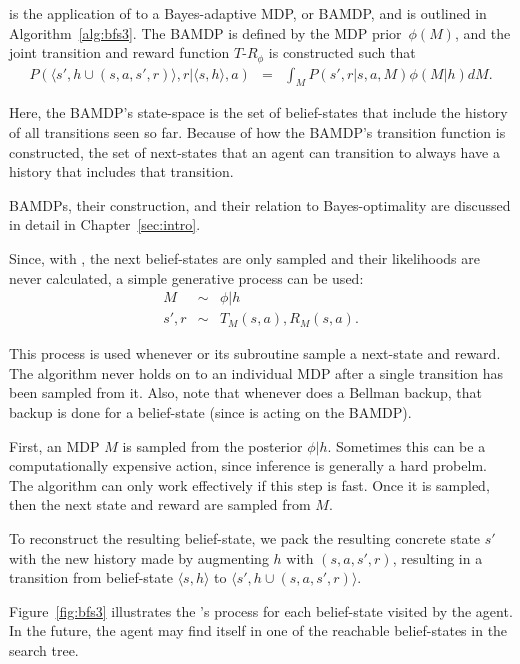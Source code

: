  is the application of  to a Bayes-adaptive MDP, or BAMDP, and is outlined in Algorithm~\ref{alg:bfs3}. The BAMDP is defined by the MDP prior~$\phi(M)$, and the joint transition and reward function ${T\mbox{-}R}_\phi$ is constructed such that
\begin{eqnarray*}
P(\langle s', h\cup (s,a,s',r)\rangle, r | \langle s, h\rangle, a) &=& \int_M P(s', r | s, a, M)\phi(M|h) dM.
\end{eqnarray*}

Here, the BAMDP's state-space is the set of belief-states that include the history of all transitions seen so far. Because of how the BAMDP's transition function is constructed, the set of next-states that an agent can transition to always have a history that includes that transition.

BAMDPs, their construction, and their relation to Bayes-optimality are discussed in detail in Chapter~\ref{sec:intro}.

Since, with , the next belief-states are only sampled and their likelihoods are never calculated, a simple generative process can be used:
\begin{eqnarray}
M &\sim& \phi|h \label{eq:oracle1}\\
s', r &\sim& T_M(s,a), R_M(s,a).\label{eq:oracle2}
\end{eqnarray}

This process is used whenever  or its subroutine  sample a next-state and reward. The algorithm never holds on to an individual MDP after a single transition has been sampled from it. Also, note that whenever  does a Bellman backup, that backup is done for a belief-state (since  is acting on the BAMDP).

First, an MDP $M$ is sampled from the posterior $\phi|h$. Sometimes this can be a computationally expensive action, since inference is generally a hard probelm. The  algorithm can only work effectively if this step is fast. Once it is sampled, then the next state and reward are sampled from $M$.

To reconstruct the resulting belief-state, we pack the resulting concrete state $s'$ with the new history made by augmenting $h$ with $(s, a, s', r)$, resulting in a transition from belief-state $\langle s, h\rangle$ to $\langle s', h\cup (s,a,s',r)\rangle$.

Figure~\ref{fig:bfs3} illustrates the 's process for each belief-state visited by the agent. In the future, the agent may find itself in one of the reachable belief-states in the search tree.


